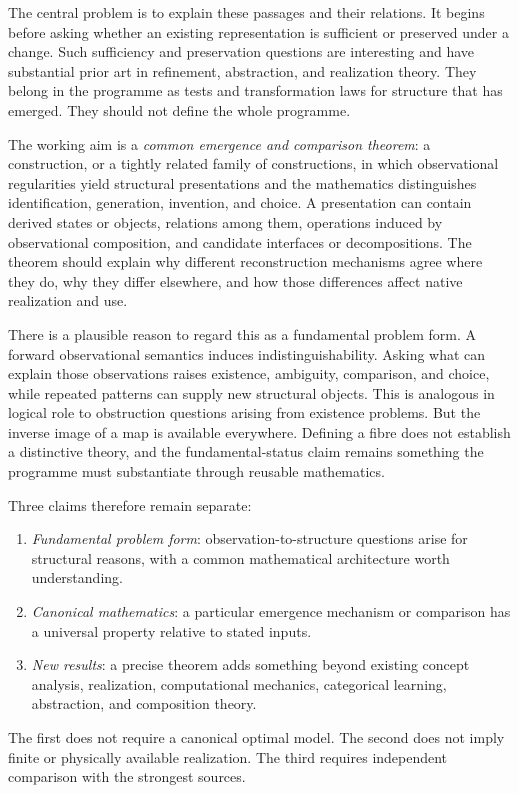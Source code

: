 \documentclass[11pt]{article}
\theoremstyle{remark}
\begin{document}
The central problem is to explain these passages and their relations. It begins before asking whether an existing representation is sufficient or preserved under a change. Such sufficiency and preservation questions are interesting and have substantial prior art in refinement, abstraction, and realization theory. They belong in the programme as tests and transformation laws for structure that has emerged. They should not define the whole programme.

The working aim is a \emph{common emergence and comparison theorem}: a construction, or a tightly related family of constructions, in which observational regularities yield structural presentations and the mathematics distinguishes identification, generation, invention, and choice. A presentation can contain derived states or objects, relations among them, operations induced by observational composition, and candidate interfaces or decompositions. The theorem should explain why different reconstruction mechanisms agree where they do, why they differ elsewhere, and how those differences affect native realization and use.

There is a plausible reason to regard this as a fundamental problem form. A forward observational semantics induces indistinguishability. Asking what can explain those observations raises existence, ambiguity, comparison, and choice, while repeated patterns can supply new structural objects. This is analogous in logical role to obstruction questions arising from existence problems. But the inverse image of a map is available everywhere. Defining a fibre does not establish a distinctive theory, and the fundamental-status claim remains something the programme must substantiate through reusable mathematics.

Three claims therefore remain separate:
\begin{enumerate}
\item \emph{Fundamental problem form}: observation-to-structure questions arise for structural reasons, with a common mathematical architecture worth understanding.
\item \emph{Canonical mathematics}: a particular emergence mechanism or comparison has a universal property relative to stated inputs.
\item \emph{New results}: a precise theorem adds something beyond existing concept analysis, realization, computational mechanics, categorical learning, abstraction, and composition theory.
\end{enumerate}
The first does not require a canonical optimal model. The second does not imply finite or physically available realization. The third requires independent comparison with the strongest sources.
\end{document}
